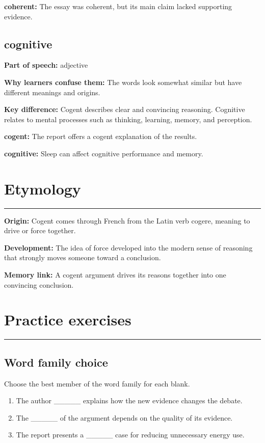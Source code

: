 \documentclass[11pt]{article}
\newcommand{\sectionrule}{\par\vspace{-0.5em}\noindent\textcolor{Accent}{\rule{\linewidth}{0.6pt}}\par}
\begin{document}
\textbf{coherent:} The essay was coherent, but its main claim lacked supporting evidence.

\subsection{cognitive}
\textbf{Part of speech:} adjective

\textbf{Why learners confuse them:} The words look somewhat similar but have different meanings and origins.

\textbf{Key difference:} Cogent describes clear and convincing reasoning. Cognitive relates to mental processes such as thinking, learning, memory, and perception.

\textbf{cogent:} The report offers a cogent explanation of the results.

\textbf{cognitive:} Sleep can affect cognitive performance and memory.

\section{Etymology}
\sectionrule
\textbf{Origin:} Cogent comes through French from the Latin verb cogere, meaning to drive or force together.

\textbf{Development:} The idea of force developed into the modern sense of reasoning that strongly moves someone toward a conclusion.

\textbf{Memory link:} A cogent argument drives its reasons together into one convincing conclusion.

\section{Practice exercises}
\sectionrule
\subsection{Word family choice}
Choose the best member of the word family for each blank.

\begin{enumerate}
  \item The author \_\_\_\_\_ explains how the new evidence changes the debate.
  \item The \_\_\_\_\_ of the argument depends on the quality of its evidence.
  \item The report presents a \_\_\_\_\_ case for reducing unnecessary energy use.
\end{enumerate}
\end{document}
